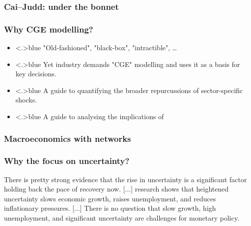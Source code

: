 \documentclass[handout,english]{beamer}
\begin{document}
\begin{frame}
  \frametitle{Cai--Judd: under the bonnet}
  

\end{frame}

\begin{frame}
  \frametitle{Why CGE modelling?}

  \begin{itemize}
    \item<+-|alert@+>{\color<.>{blue}
      "Old-fashioned", "black-box", "intractible", \dots
    }
    \item<+-|alert@+>{\color<.>{blue}
      Yet industry demands "CGE" modelling and uses it as a basis for key 
      decisions.
    }
    \item<+-|alert@+>{\color<.>{blue}
      A guide to quantifying the broader repurcussions of sector-specific
      shocks.
    }
    \item<+-|alert@+>{\color<.>{blue}
      A guide to analysing the implications of 
    }
  \end{itemize}
\vfill
\end{frame}
\begin{frame}
\frametitle{Macroeconomics with networks}

\end{frame}

\begin{frame}
\frametitle{Why the focus on uncertainty?}

There is pretty strong evidence that the rise in uncertainty is a significant factor holding back the pace of recovery now. [...] research shows that heightened uncertainty slows economic growth, raises unemployment, and reduces inflationary pressures. [...] There is no question that slow growth, high unemployment, and significant uncertainty are challenges for monetary policy.
\end{frame}
\end{document}
